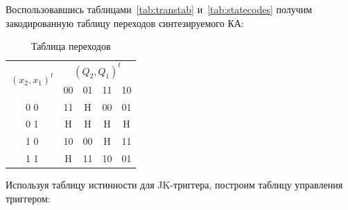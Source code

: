 \documentclass[a4paper,12pt]{article}
\begin{document}
    Воспользовавшись таблицами~\ref{tab:transtab} и~\ref{tab:statecodes} получим закодированную таблицу
    переходов синтезируемого КА:
    \begin{table}[H]
        \centering
        \begin{tabular}{|cl|cccc|}
        \hline
        \multicolumn{2}{|c|}{\multirow{2}{*}{$(x_2, x_1)^t$}} & \multicolumn{4}{c|}{$(Q_2, Q_1)^t$}                                                   \\ \cline{3-6} 
        \multicolumn{2}{|c|}{}                                & \multicolumn{1}{c|}{00} & \multicolumn{1}{c|}{01} & \multicolumn{1}{c|}{11} & 10 \\ \hline
        \multicolumn{2}{|c|}{0 0}                             & \multicolumn{1}{c|}{11} & \multicolumn{1}{c|}{H} & \multicolumn{1}{c|}{00} & 01 \\ \hline
        \multicolumn{2}{|c|}{0 1}                             & \multicolumn{1}{c|}{H} & \multicolumn{1}{c|}{H} & \multicolumn{1}{c|}{H} & H \\ \hline
        \multicolumn{2}{|c|}{1 0}                             & \multicolumn{1}{c|}{10} & \multicolumn{1}{c|}{00} & \multicolumn{1}{c|}{H} & 11 \\ \hline
        \multicolumn{2}{|c|}{1 1}                             & \multicolumn{1}{c|}{H} & \multicolumn{1}{c|}{11} & \multicolumn{1}{c|}{10} & 01 \\ \hline
        \end{tabular}
        \caption{Таблица переходов}
        \label{tab:transtab_coded}
    \end{table}    
    Используя таблицу истинности для JK-триггера, построим таблицу управления триггером:
\end{document}
